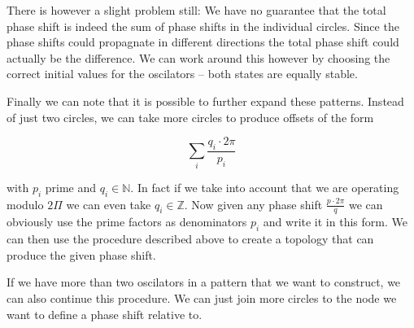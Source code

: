 There is however a slight problem still: We have no guarantee that the total phase shift is indeed the sum of phase shifts in the individual circles. Since the phase shifts could propagnate in different directions the total phase shift could actually be the difference. We can work around this however by choosing the correct initial values for the oscilators -- both states are equally stable. 

Finally we can note that it is possible to further expand these patterns. Instead of just two circles, we can take more circles to produce offsets of the form

\[
  \sum_{i}{\frac{q_i {\cdot} 2 \pi}{p_i}}
\]

with $p_i$ prime and $q_i \in \mathbb{N}$. In fact if we take into account that we are operating modulo $2 \Pi$ we can even take $q_i \in \mathbb{Z}$. 
Now given any phase shift $\frac{p {\cdot} 2 \pi}{q}$ we can obviously use the prime factors as denominators $p_i$ and write it in this form. We can then use the procedure described above to create a topology that can produce the given phase shift. 

If we have more than two oscilators in a pattern that we want to construct, we can also continue this procedure. We can just join more circles to the node we want to define a phase shift relative to. 